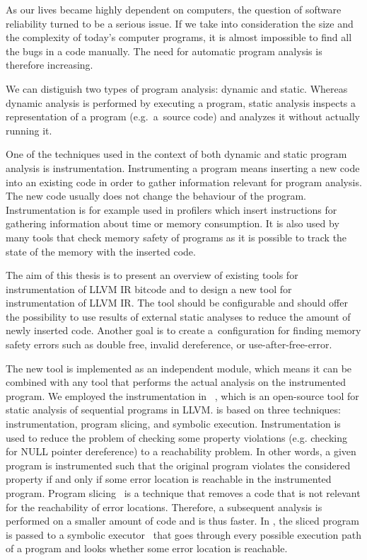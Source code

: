 As our lives became highly dependent on computers, the question of software
reliability turned to be a serious issue. If we take into consideration the
size and the complexity of today's computer programs, it is almost impossible
to find all the bugs in a code manually. The need for automatic program
analysis is therefore increasing.

We can distiguish two types of program analysis: dynamic and static. Whereas
dynamic analysis is performed by executing a program, static analysis
inspects a representation of a program (e.g.~a~source code) and analyzes it
without actually running it.

One of the techniques used in the context of both dynamic and static program
analysis is instrumentation. Instrumenting a program means inserting a new code
into an existing code in order to gather information relevant for program
analysis. The new code usually does not change the behaviour of the program.
Instrumentation is for example used in profilers which insert instructions for
gathering information about time or memory consumption. It is also used by many
tools that check memory safety of programs as it is possible to track the state
of the memory with the inserted code.

The aim of this thesis is to present an overview of existing tools for
instrumentation of LLVM IR bitcode and to design a new tool for
instrumentation of LLVM IR. The tool should be configurable and should offer the
possibility to use results of external static analyses to reduce the amount of
newly inserted code. Another goal is to create a~configuration for finding
memory safety errors such as double free, invalid dereference, or
use-after-free-error.

The new tool is implemented as an independent module, which means it can be
combined with any tool that performs the actual analysis on the instrumented
program. We employed the instrumentation in \symbiotic~\cite{Symbiotic}, which
is an open-source tool for static analysis of sequential programs in LLVM.
\symbiotic is based on three techniques: instrumentation, program slicing, and
symbolic execution. Instrumentation is used to reduce the problem of checking
some property violations (e.g. checking for NULL pointer dereference) to a
reachability problem. In other words, a given program is instrumented such that
the original program violates the considered property if and only if some error
location is reachable in the instrumented program. Program
slicing~\cite{weiser} is a technique that removes a code that is not relevant
for the reachability of error locations. Therefore, a subsequent analysis is
performed on a smaller amount of code and is thus faster. In \symbiotic,
the sliced program is passed to a symbolic executor~\cite{King} that goes
through every possible execution path of a program and looks whether some
error location is reachable.


